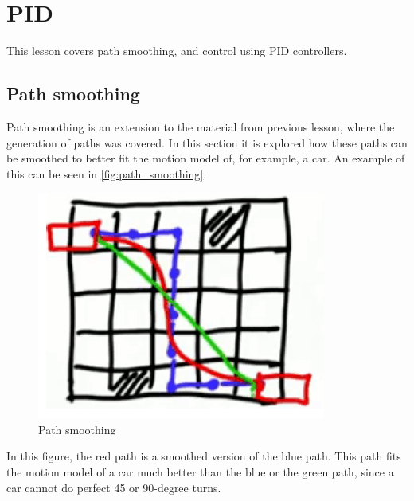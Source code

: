\documentclass[Main]{subfiles}
\begin{document}
\section{PID} %
	\label{sec:pid}
This lesson covers path smoothing, and control using PID controllers.

\subsection{Path smoothing}
Path smoothing is an extension to the material from previous lesson, where the generation of paths was covered. 
In this section it is explored how these paths can be smoothed to better fit the motion model of, for example, a car. 
An example of this can be seen in \autoref{fig:path_smoothing}.
\begin{figure}[H]
	\centering
	\includegraphics[scale=1]{./Figures/path_smoothing.png}
	\caption{Path smoothing}
	\label{fig:path_smoothing}
\end{figure}\noindent
In this figure, the red path is a smoothed version of the blue path. 
This path fits the motion model of a car much better than the blue or the green path, since a car cannot do perfect 45 or 90-degree turns.
\end{document}
